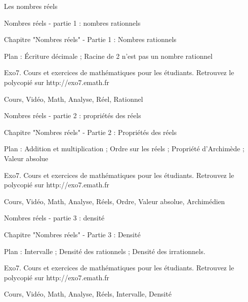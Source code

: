 
  Les nombres réels


Nombres réels - partie 1 : nombres rationnels




Chapitre "Nombres réels" - Partie 1 : Nombres rationnels

Plan : Écriture décimale ; Racine de 2 n'est pas un nombre rationnel

Exo7. Cours et exercices de mathématiques pour les étudiants.
Retrouvez le polycopié sur http://exo7.emath.fr


Cours, Vidéo, Math, Analyse, Réel, Rationnel





Nombres réels - partie 2 : propriétés des réels



Chapitre "Nombres réels" - Partie 2 : Propriétés des réels

Plan : Addition et multiplication ; Ordre sur les réels ;
Propriété d'Archimède ; Valeur absolue

Exo7. Cours et exercices de mathématiques pour les étudiants.
Retrouvez le polycopié sur http://exo7.emath.fr


Cours, Vidéo, Math, Analyse, Réels, Ordre, Valeur absolue, Archimédien




Nombres réels - partie 3 : densité



Chapitre "Nombres réels" - Partie 3 : Densité

Plan : Intervalle ; Densité des rationnels ;
Densité des irrationnels.

Exo7. Cours et exercices de mathématiques pour les étudiants.
Retrouvez le polycopié sur http://exo7.emath.fr


Cours, Vidéo, Math, Analyse, Réels, Intervalle, Densité




